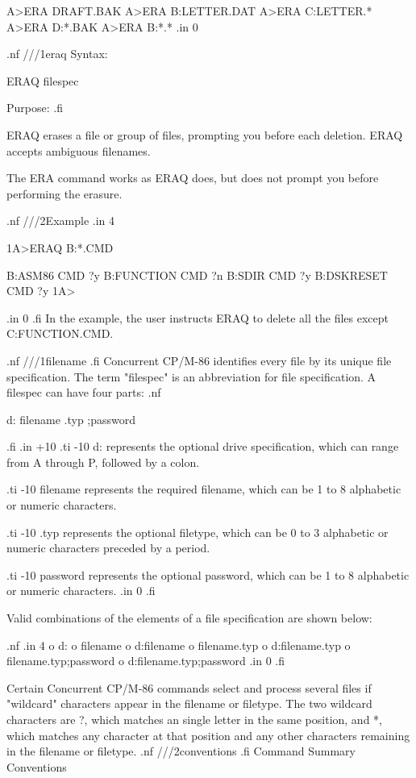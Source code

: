 A>ERA DRAFT.BAK
A>ERA B:LETTER.DAT
A>ERA C:LETTER.*
A>ERA D:*.BAK
A>ERA B:*.*
.in 0

.nf
///1eraq
Syntax: 

ERAQ filespec

Purpose:
.fi

ERAQ erases a file or group of files, prompting you before each
deletion.  ERAQ accepts ambiguous filenames. 

The ERA command works as ERAQ does, but does not prompt you
before performing the erasure. 

.nf
///2Example
.in 4

1A>ERAQ B:*.CMD

B:ASM86      CMD ?y
B:FUNCTION   CMD ?n
B:SDIR       CMD ?y
B:DSKRESET   CMD ?y
1A>

.in 0
.fi
In the example, the user instructs ERAQ to delete all the files
except C:FUNCTION.CMD. 

.nf
///1filename
.fi
Concurrent CP/M-86 identifies every file by its unique file
specification.  The term "filespec" is an abbreviation for file 
specification. A filespec can have four parts:  
.nf

             d:  filename  .typ  ;password

.fi
.in +10
.ti -10
 d:        represents the optional drive specification, which can
range from A through P, followed by a colon. 

.ti -10
 filename  represents the required filename, which can be
1 to 8 alphabetic or numeric characters. 

.ti -10
 .typ       represents the optional filetype, which can be 0 to 3
alphabetic or numeric characters preceded by a period. 

.ti -10
 password   represents the optional password, which can be 1 to 8
alphabetic or numeric characters.
.in 0
.fi

Valid combinations of the elements of a file specification are
shown below: 

.nf
.in 4
o  d:
o  filename
o  d:filename
o  filename.typ
o  d:filename.typ
o  filename.typ;password
o  d:filename.typ;password
.in 0
.fi

Certain Concurrent CP/M-86 commands select and process several
files if "wildcard" characters appear in the filename or
filetype. The two wildcard characters are ?, which matches an
single letter in the same position, and *, which matches any
character at that position and any other characters remaining in
the filename or filetype.
.nf
///2conventions
.fi
Command Summary Conventions

